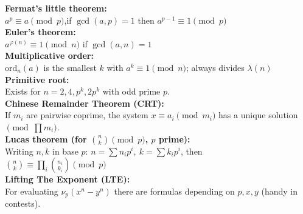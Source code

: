 \textbf{Fermat's little theorem:} \\[1mm]
$a^{p}\equiv a \pmod p$,\quad if $\gcd(a,p)=1$ then $a^{p-1}\equiv 1\pmod p$ \\

\textbf{Euler's theorem:} \\[1mm]
$a^{\varphi(n)}\equiv 1 \pmod n$ if $\gcd(a,n)=1$ \\

\textbf{Multiplicative order:} \\[1mm]
$\mathrm{ord}_n(a)$ is the smallest $k$ with $a^k\equiv1\pmod n$; always divides $\lambda(n)$ \\

\textbf{Primitive root:} \\[1mm]
Exists for $n=2,4,p^k,2p^k$ with odd prime $p$. \\

\textbf{Chinese Remainder Theorem (CRT):} \\[1mm]
If $m_i$ are pairwise coprime, the system $x\equiv a_i\pmod{m_i}$ has a unique solution $\pmod{\prod m_i}$. \\

\textbf{Lucas theorem (for $\binom{n}{k}\pmod p$, $p$ prime):} \\[1mm]
Writing $n,k$ in base $p$: $n=\sum n_i p^i,\ k=\sum k_i p^i$, then \\
$\displaystyle \binom{n}{k}\equiv \prod_i \binom{n_i}{k_i}\pmod p$ \\

\textbf{Lifting The Exponent (LTE):} \\[1mm]
For evaluating $\nu_p(x^n-y^n)$ there are formulas depending on $p,x,y$ (handy in contests). \\
